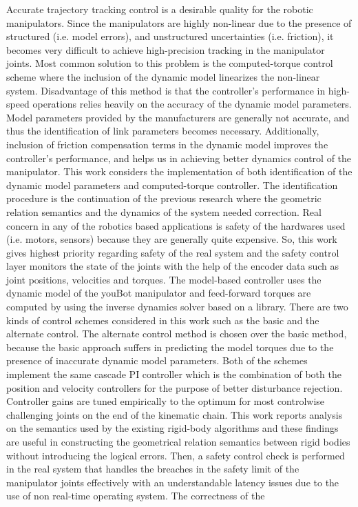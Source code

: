 \specialhead{\abstractname}

Accurate trajectory tracking control is a desirable quality for the robotic manipulators. Since the manipulators are highly non-linear due to the presence of structured (i.e. model errors), and unstructured uncertainties (i.e. friction), it becomes very difficult to achieve high-precision tracking in the manipulator joints. Most common solution to this problem is the computed-torque control scheme where the inclusion of the dynamic model linearizes the non-linear system. Disadvantage of this method is that the controller's performance in high-speed operations relies heavily on the accuracy of the dynamic model parameters. Model parameters provided by the manufacturers are generally not accurate, and thus the identification of link parameters becomes necessary. Additionally, inclusion of friction compensation terms in the dynamic model improves the controller's performance, and helps us in achieving better dynamics control of the manipulator. This work considers the implementation of both identification of the dynamic model parameters and computed-torque controller. The identification procedure is the continuation of the previous research where the geometric relation semantics and the dynamics of the system needed correction. Real concern in any of the robotics based applications is safety of the hardwares used (i.e. motors, sensors) because they are generally quite expensive. So, this work gives highest priority regarding safety of the real system and the safety control layer monitors the state of the joints with the help of the encoder data such as joint positions, velocities and torques. The model-based controller uses the dynamic model of the youBot manipulator and feed-forward torques are computed by using the inverse dynamics solver based on a library. There are two kinds of control schemes considered in this work such as the basic and the alternate control. The alternate control method is chosen over the basic method, because the basic approach suffers in predicting the model torques due to the presence of inaccurate dynamic model parameters. Both of the schemes implement the same cascade PI controller which is the combination of both the position and velocity controllers for the purpose of better disturbance rejection. Controller gains are tuned empirically to the optimum for most controlwise challenging joints on the end of the kinematic chain. This work reports analysis on the semantics used by the existing rigid-body algorithms and these findings are useful in constructing the geometrical relation semantics between rigid bodies without introducing the logical errors. Then, a safety control check is performed in the real system that handles the breaches in the safety limit of the manipulator joints effectively with an understandable latency issues due to the use of non real-time operating system. The correctness of the 